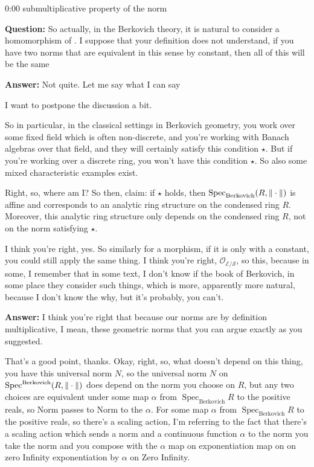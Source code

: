 \begin{unfinished}{0:00}
submultiplicative property of the norm

\textbf{Question:} So actually, in the Berkovich theory,  it is natural to consider a homomorphism of .
I suppose that your definition does not understand, if you have two norms that are equivalent in this sense by constant, then all of this will be the same

\textbf{Answer:} Not quite. Let me say what I can say 

I want to postpone the discussion a bit.

So in particular, in the classical settings in Berkovich geometry, you work over some fixed field which is often non-discrete, and you're working with Banach algebras over that field, and they will certainly satisfy this condition $\star$. But if you're working over a discrete ring, you won't have this condition $\star$. 
So also some mixed characteristic examples exist.

Right, so, where am I? So then, claim: if $\star$ holds, then $\operatorname{Spec}_{\mathrm{Berkovich}} (R, \| \cdot \|)$ is affine and corresponds to an analytic ring structure on the condensed ring $R$. Moreover, this analytic ring structure only depends on the condensed ring $R$, not on the norm satisfying $\star$.

I think you're right, yes. So similarly for a morphism, if it is only with a constant, you could still apply the same thing. I think you're right, $\mathcal{O}_{\mathcal{E}/\mathcal{S}}$, so this, because in some, I remember that in some text, I don't know if the book of Berkovich, in some place they consider such things, which is more, apparently more natural, because I don't know the why, but it's probably, you can't.

\textbf{Answer:} I think you're right that because our norms are by definition multiplicative, I mean, these geometric norms that you can argue exactly as you suggested.

That's a good point, thanks. Okay, right, so, what doesn't depend on this thing, you have this universal norm $N$, so the universal norm $N$ on $\operatorname{Spec}^{\mathrm{Berkovich}} (R, \| \cdot \|)$ does depend on the norm you choose on $R$, but any two choices are equivalent under some map $\alpha$ from $\operatorname{Spec}_{\mathrm{Berkovich}} R$ to the positive reals, so Norm passes to Norm to the $\alpha$. For some map $\alpha$ from $\operatorname{Spec}_{\mathrm{Berkovich}} R$ to the positive reals, so there's a scaling action, I'm referring to the fact that there's a scaling action which sends a norm and a continuous function $\alpha$ to the norm you take the norm and you compose with the $\alpha$ map on exponentiation map on on zero Infinity exponentiation by $\alpha$ on Zero Infinity.


\end{unfinished}
